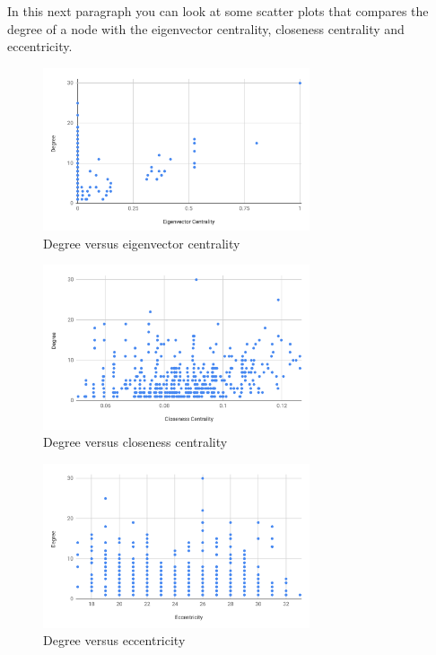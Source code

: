 \documentclass{article}
\begin{document}
    \bigskip
    
    \noindent In this next paragraph you can look at some scatter plots that compares the degree of a node with the eigenvector centrality, closeness centrality and eccentricity.

    \begin{figure}[H]
        \centering
        \includegraphics[width=0.7\textwidth]{3.1.png}
        \caption{Degree versus eigenvector centrality}
        \label{fig:figure-3.1}
    \end{figure}
    
    \begin{figure}[H]
        \centering
        \includegraphics[width=0.7\textwidth]{3.2.png}
        \caption{Degree versus closeness centrality}
        \label{fig:figure-3.2}
    \end{figure}
    
    \begin{figure}[H]
        \centering
        \includegraphics[width=0.7\textwidth]{3.3.png}
        \caption{Degree versus eccentricity}
        \label{fig:figure-3.3}
    \end{figure}
\end{document}
